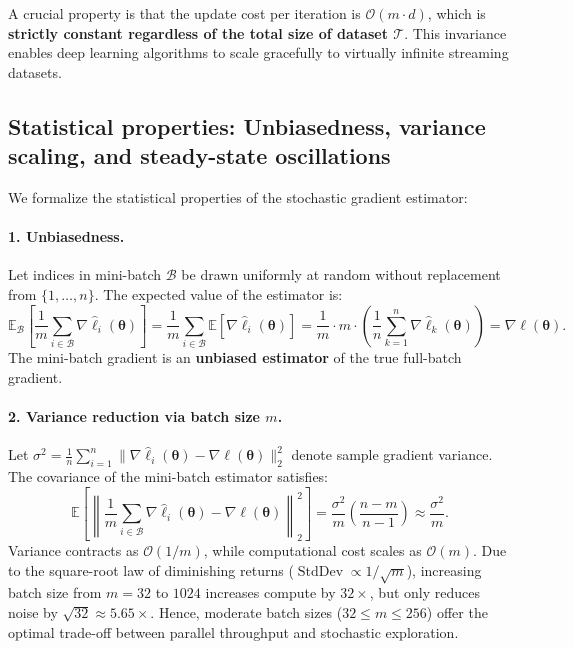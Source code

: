 \begin{remark}
A crucial property is that the update cost per iteration is $\mathcal{O}(m \cdot d)$, which is \textbf{strictly constant regardless of the total size of dataset $\mathcal{T}$}. This invariance enables deep learning algorithms to scale gracefully to virtually infinite streaming datasets.
\end{remark}

\subsection{Statistical properties: Unbiasedness, variance scaling, and steady-state oscillations}
\label{sec:minibatch_statistics}

We formalize the statistical properties of the stochastic gradient estimator:

\paragraph{1. Unbiasedness.}
Let indices in mini-batch $\mathcal{B}$ be drawn uniformly at random without replacement from $\{1, \dots, n\}$. The expected value of the estimator is:
\begin{equation}
\mathbb{E}_{\mathcal{B}}\left[ \frac{1}{m} \sum_{i \in \mathcal{B}} \nabla \hat{\ell}_i(\boldsymbol{\theta}) \right] = \frac{1}{m} \sum_{i \in \mathcal{B}} \mathbb{E}\left[ \nabla \hat{\ell}_i(\boldsymbol{\theta}) \right] = \frac{1}{m} \cdot m \cdot \left( \frac{1}{n} \sum_{k=1}^n \nabla \hat{\ell}_k(\boldsymbol{\theta}) \right) = \nabla \ell(\boldsymbol{\theta}).
\label{eq:unbiased_gradient}
\end{equation}
The mini-batch gradient is an \textbf{unbiased estimator} of the true full-batch gradient.

\paragraph{2. Variance reduction via batch size $m$.}
Let $\sigma^2 = \frac{1}{n} \sum_{i=1}^n \|\nabla \hat{\ell}_i(\boldsymbol{\theta}) - \nabla \ell(\boldsymbol{\theta})\|_2^2$ denote sample gradient variance. The covariance of the mini-batch estimator satisfies:
\begin{equation}
\mathbb{E}\left[ \left\| \frac{1}{m} \sum_{i \in \mathcal{B}} \nabla \hat{\ell}_i(\boldsymbol{\theta}) - \nabla \ell(\boldsymbol{\theta}) \right\|_2^2 \right] = \frac{\sigma^2}{m} \left( \frac{n - m}{n - 1} \right) \approx \frac{\sigma^2}{m}.
\label{eq:minibatch_variance_reduction}
\end{equation}
Variance contracts as $\mathcal{O}(1/m)$, while computational cost scales as $\mathcal{O}(m)$. Due to the square-root law of diminishing returns ($\operatorname{StdDev} \propto 1/\sqrt{m}$), increasing batch size from $m = 32$ to $1024$ increases compute by $32\times$, but only reduces noise by $\sqrt{32} \approx 5.65\times$. Hence, moderate batch sizes ($32 \le m \le 256$) offer the optimal trade-off between parallel throughput and stochastic exploration.

